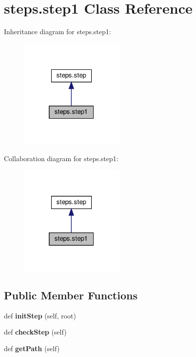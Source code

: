 \hypertarget{classsteps_1_1step1}{}\section{steps.\+step1 Class Reference}
\label{classsteps_1_1step1}


Inheritance diagram for steps.\+step1\+:
\nopagebreak
\begin{figure}[H]
\begin{center}
\leavevmode
\includegraphics[width=148pt]{classsteps_1_1step1__inherit__graph}
\end{center}
\end{figure}


Collaboration diagram for steps.\+step1\+:
\nopagebreak
\begin{figure}[H]
\begin{center}
\leavevmode
\includegraphics[width=148pt]{classsteps_1_1step1__coll__graph}
\end{center}
\end{figure}
\subsection*{Public Member Functions}
\begin{DoxyCompactItemize}
\item 
\mbox{\label{classsteps_1_1step1_ac3d8a1af31803d0ea55f43b2d17aa33e}} 
def {\bfseries init\+Step} (self, root)
\item 
\mbox{\label{classsteps_1_1step1_a3bad46d0d59345e010b68b29163f4c11}} 
def {\bfseries check\+Step} (self)
\item 
\mbox{\label{classsteps_1_1step1_ad24a68d21b5b09de56642819b9473c74}} 
def {\bfseries get\+Path} (self)
\end{DoxyCompactItemize}
